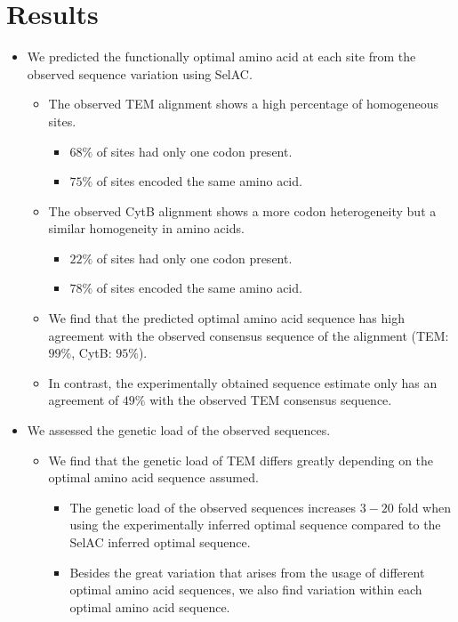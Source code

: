 \documentclass[12pt]{article}
\begin{document}
\section*{Results}
\begin{itemize}
	\item We predicted the functionally optimal amino acid at each site from the observed sequence variation using SelAC.
	\begin{itemize}
		\item The observed TEM alignment shows a high percentage of homogeneous sites.
		\begin{itemize} 
			\item $68 \%$ of sites had only one codon present.
			\item $75 \%$ of sites encoded the same amino acid.
		\end{itemize}
		\item The observed CytB alignment shows a more codon heterogeneity but a similar homogeneity in amino acids.
		\begin{itemize} 
			\item $22 \%$ of sites had only one codon present.
			\item $78 \%$ of sites encoded the same amino acid.
		\end{itemize}
		\item We find that the predicted optimal amino acid sequence has high agreement with the observed consensus sequence of the alignment (TEM: $99 \%$, CytB: $95 \%$).
		\item In contrast, the experimentally obtained sequence estimate only has an agreement of $49 \%$ with the observed TEM consensus sequence.
	\end{itemize}
	\item We assessed the genetic load of the observed sequences.
	\begin{itemize}
		\item We find that the genetic load of TEM differs greatly depending on the optimal amino acid sequence assumed.
		\begin{itemize}
			\item The genetic load of the observed sequences increases $3-20$ fold when using the experimentally inferred optimal sequence compared to the SelAC inferred optimal sequence.
			\item Besides the great variation that arises from the usage of different optimal amino acid sequences, we also find variation within each optimal amino acid sequence.

\end{itemize}
\end{itemize}
\end{itemize}
\end{document}
